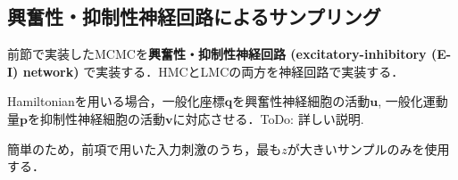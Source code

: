 \subsection{興奮性・抑制性神経回路によるサンプリング}
前節で実装したMCMCを\textbf{興奮性・抑制性神経回路 (excitatory-inhibitory (E-I) network)} で実装する．HMCとLMCの両方を神経回路で実装する．

Hamiltonianを用いる場合，一般化座標$\mathbf{q}$を興奮性神経細胞の活動$\mathbf{u}$, 一般化運動量$\mathbf{p}$を抑制性神経細胞の活動$\mathbf{v}$に対応させる．ToDo: 詳しい説明.

簡単のため，前項で用いた入力刺激のうち，最も$z$が大きいサンプルのみを使用する．
